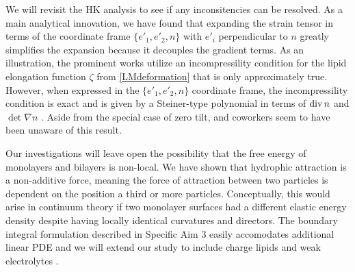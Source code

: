   We will revisit the HK analysis to see if any inconsitencies can be resolved.
  As a main analytical innovation, we have found that expanding the strain tensor in
  terms of the coordinate frame $\{e'_1, e'_2, n\}$ with $e'_i$ perpendicular to $n$
  greatly simplifies the expansion because it decouples the gradient terms. As an illustration, the prominent works
  \cite{TerziDeserno17, PhysRevE.102.042406, Hamm2000, C9SM02079A} utilize an
  incompressility condition for the lipid elongation function $\zeta$ from \eqref{LMdeformation} that is only approximately true. 
  However, when expressed in the $\{e'_1, e'_2, n\}$ coordinate frame, the incompressility condition is exact
  and is given by a Steiner-type polynomial in terms of $\operatorname{div} n$ and $\det \nabla n$ \cite{Fe59}.
  Aside from the special case of zero tilt, \cite{Hamm2000} and coworkers seem to have been unaware of this result.

Our investigations will leave open the possibility that the free energy of monolayers and bilayers is non-local. 
We have shown that hydrophic attraction is a non-additive force, meaning the force of attraction between two
particles is dependent on the position a third or more particles. Conceptually, this would arise in continuum theory if two monolayer surfaces
had a different elastic energy density despite having locally identical curvatures and directors.
The boundary integral formulation described in Specific Aim 3 easily accomodates additional linear PDE and
we will extend our study to include charge lipids and weak electrolytes \cite{C9SM00772E}.

